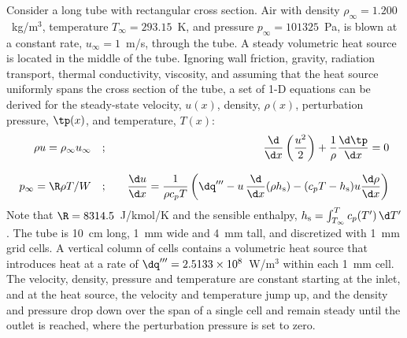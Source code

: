 \documentclass[11pt]{book}
\begin{document}
Consider a long tube with rectangular cross section. Air with density $\rho_\infty=1.200$~kg/m$^3$, temperature $T_\infty=293.15$~K, and pressure $p_\infty=101325$~Pa, is blown at a constant rate, $u_\infty=1$~m/s, through the tube. A steady volumetric heat source is located in the middle of the tube. Ignoring wall friction, gravity, radiation transport, thermal conductivity, viscosity, and assuming that the heat source uniformly spans the cross section of the tube, a set of 1-D equations can be derived for the steady-state velocity, $u(x)$, density, $\rho(x)$, perturbation pressure, $\tp(x)$, and temperature, $T(x)$:
\begin{eqnarray}
   \rho u = \rho_\infty u_\infty   \quad &;& \quad \frac{\d}{\d x} \left( \frac{u^2}{2} \right) + \frac{1}{\rho} \frac{\d \tp}{\d x} = 0 \label{mom1d} \\[.1in]
   p_\infty = \R \rho T / W            \quad &;& \quad \frac{\d u}{\d x} = \frac{1}{\rho c_p T} \left( \dq''' - u \, \frac{\d}{\d x} (\rho h_{\rm s}) - (c_p T - h_{\rm s}) u \frac{\d \rho}{\d x}  \right)  \label{div1d}
\end{eqnarray}
Note that $\R=8314.5$~J/kmol/K and the sensible enthalpy, $h_{\rm s}=\int_{T_\infty}^T c_p(T') \, \d T'$. The tube is 10~cm long, 1~mm wide and 4~mm tall, and discretized with 1~mm grid cells. A vertical column of cells contains a volumetric heat source that introduces heat at a rate of $\dq'''=2.5133 \times 10^8$~W/m$^3$ within each 1~mm cell. The velocity, density, pressure and temperature are constant starting at the inlet, and at the heat source, the velocity and temperature jump up, and the density and pressure drop down over the span of a single cell and remain steady until the outlet is reached, where the perturbation pressure is set to zero.
\end{document}
